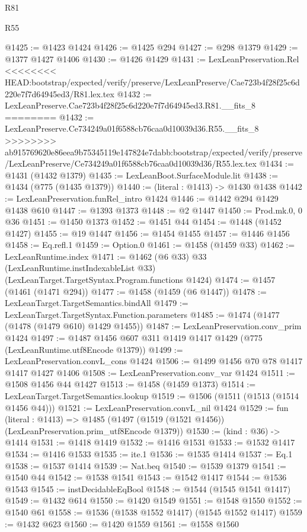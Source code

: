 \begin{lexlean}{R81}
\begin{lexlean}{R55}
\begin{coremodule}
{{{{{{{{{{{{{{{{{{{{{{{{{{{{{{{{{{{{{{{{{{{{{{{{{{{{{{{{{{{{{{@1425 := @1423 @1424
@1426 := @1425 @294
@1427 := @298 @1379
@1429 := @1377 @1427 @1406
@1430 := @1426 @1429
@1431 := LexLeanPreservation.Rel
<<<<<<<< HEAD:bootstrap/expected/verify/preserve/LexLeanPreserve/Cae723b4f28f25c6d220e7f7d64945ed3/R81.lex.tex
@1432 := LexLeanPreserve.Cae723b4f28f25c6d220e7f7d64945ed3.R81.__fits_8
========
@1432 := LexLeanPreserve.Ce734249a01f6588cb76caa0d10039d36.R55.__fits_8
>>>>>>>> ab915769620e86eea9b75345119e147824e7dabb:bootstrap/expected/verify/preserve/LexLeanPreserve/Ce734249a01f6588cb76caa0d10039d36/R55.lex.tex
@1434 := @1431 (@1432 @1379)
@1435 := LexLeanBoot.SurfaceModule.lit
@1438 := @1434 (@775 (@1435 @1379))
@1440 := (literal : @1413) -> @1430 @1438
@1442 := LexLeanPreservation.funRel_intro @1424
@1446 := @1442 @294 @1429 @1438 @610
@1447 := @1393 @1373
@1448 := @2 @1447
@1450 := Prod.mk.{0, 0} @36
@1451 := @1450 @1373
@1452 := @1451 @44
@1454 := @1448 (@1452 @1427)
@1455 := @19 @1447
@1456 := @1454 @1455
@1457 := @1446 @1456
@1458 := Eq.refl.{1}
@1459 := Option.{0}
@1461 := @1458 (@1459 @33)
@1462 := LexLeanRuntime.index
@1471 := @1462
    (@6 @33)
    @33
    (LexLeanRuntime.instIndexableList @33)
    (LexLeanTarget.TargetSyntax.Program.functions @1424)
@1474 := @1457 (@1461 (@1471 @294))
@1477 := @1458 (@1459 (@6 @1447))
@1478 := LexLeanTarget.TargetSemantics.bindAll
@1479 := LexLeanTarget.TargetSyntax.Function.parameters
@1485 := @1474 (@1477 (@1478 (@1479 @610) @1429 @1455))
@1487 := LexLeanPreservation.conv_prim @1424
@1497 := @1487 @1456 @607 @311 @1419 @1417 @1429 (@775 (LexLeanRuntime.utf8Encode @1379))
@1499 := LexLeanPreservation.convL_cons @1424
@1506 := @1499 @1456 @70 @78 @1417 @1417 @1427 @1406
@1508 := LexLeanPreservation.conv_var @1424
@1511 := @1508 @1456 @44 @1427
@1513 := @1458 (@1459 @1373)
@1514 := LexLeanTarget.TargetSemantics.lookup
@1519 := @1506 (@1511 (@1513 (@1514 @1456 @44)))
@1521 := LexLeanPreservation.convL_nil @1424
@1529 := fun (literal : @1413) =>
  @1485 (@1497 (@1519 (@1521 @1456)) (LexLeanPreservation.prim_utf8Encode @1379))
@1530 := (kind : @36) -> @1414
@1531 := @1418 @1419
@1532 := @1416 @1531
@1533 := @1532 @1417
@1534 := @1416 @1533
@1535 := ite.{1}
@1536 := @1535 @1414
@1537 := Eq.{1}
@1538 := @1537 @1414
@1539 := Nat.beq
@1540 := @1539 @1379
@1541 := @1540 @44
@1542 := @1538 @1541
@1543 := @1542 @1417
@1544 := @1536 @1543
@1545 := instDecidableEqBool
@1548 := @1544 (@1545 @1541 @1417)
@1549 := @1432 @614
@1550 := @1420 @1549
@1551 := @1548 @1550
@1552 := @1540 @61
@1558 := @1536 (@1538 @1552 @1417) (@1545 @1552 @1417)
@1559 := @1432 @623
@1560 := @1420 @1559
@1561 := @1558 @1560
}}}}}}}}}}}}}}}}}}}}}}}}}}}}}}}}}}}}}}}}}}}}}}}}}}}}}}}}}}}}}}
\end{coremodule}
\end{lexlean}
\end{lexlean}
